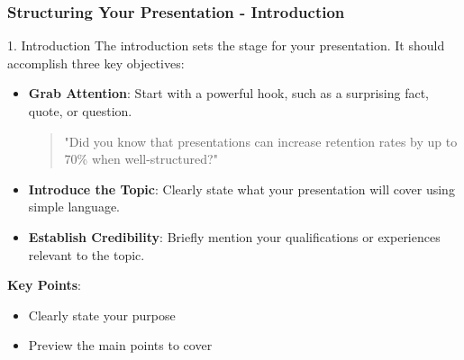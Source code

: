 \documentclass[aspectratio=169]{beamer}
\begin{document}
\begin{frame}[fragile]
    \frametitle{Structuring Your Presentation - Introduction}
    \begin{block}{1. Introduction}
        The introduction sets the stage for your presentation. It should accomplish three key objectives:
        \begin{itemize}
            \item \textbf{Grab Attention}: Start with a powerful hook, such as a surprising fact, quote, or question.
                \begin{quote}
                    "Did you know that presentations can increase retention rates by up to 70\% when well-structured?"
                \end{quote}
            \item \textbf{Introduce the Topic}: Clearly state what your presentation will cover using simple language.
            \item \textbf{Establish Credibility}: Briefly mention your qualifications or experiences relevant to the topic.
        \end{itemize}
        \textbf{Key Points}:
        \begin{itemize}
            \item Clearly state your purpose
            \item Preview the main points to cover
        \end{itemize}
    \end{block}
\end{frame}
\end{document}
